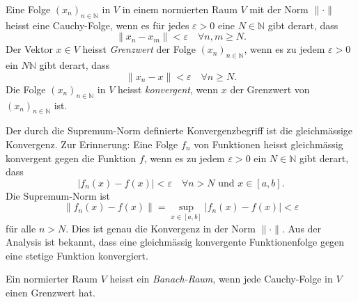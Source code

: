 \begin{definition}
Eine Folge $(x_n)_{n\in\mathbb{N}}$ in $V$ in einem normierten Raum $V$
mit der Norm $\|\cdot\|$
heisst eine Cauchy-Folge, wenn es für jedes $\varepsilon>0$ eine
%
$N\in \mathbb{N}$ gibt derart, dass
\[
\| x_n - x_m \| < \varepsilon
\quad\forall n,m\ge N.
\]
Der Vektor $x\in V$ heisst {\em Grenzwert} der Folge $(x_n)_{n\in\mathbb{N}}$,
%
wenn es zu jedem $\varepsilon > 0$ ein $N\mathbb{N}$ gibt derart, dass
\[
\|x_n-x\| < \varepsilon 
\quad\forall n\ge N.
\]
Die Folge $(x_n)_{n\in\mathbb{N}}$  in $V$ heisst {\em konvergent}, wenn
%
$x$ der Grenzwert von $(x_n)_{n\in\mathbb{N}}$ ist.
\end{definition}

Der durch die Supremum-Norm definierte Konvergenzbegriff ist die gleichmässige
Konvergenz.
Zur Erinnerung:
Eine Folge $f_n$ von Funktionen heisst gleichmässig konvergent gegen die
Funktion $f$, wenn es zu jedem
$\varepsilon >0$ ein $N\in\mathbb{N}$ gibt derart, dass
\[
|f_n(x) - f(x)|<\varepsilon\quad\forall n>N\text{ und }x\in [a,b].
\]
Die Supremum-Norm ist
\[
\|f_n(x) - f(x)\|
=
\sup_{x\in[a,b]} |f_n(x)-f(x)| < \varepsilon
\]
für alle $n>N$.
Dies ist genau die Konvergenz in der Norm $\|\cdot\|$.
Aus der Analysis ist bekannt, dass eine gleichmässig konvergente 
Funktionenfolge gegen eine stetige Funktion konvergiert.

\begin{definition}
Ein normierter Raum $V$ heisst ein {\em Banach-Raum},
%
wenn jede Cauchy-Folge in $V$ einen Grenzwert hat.
\end{definition}

